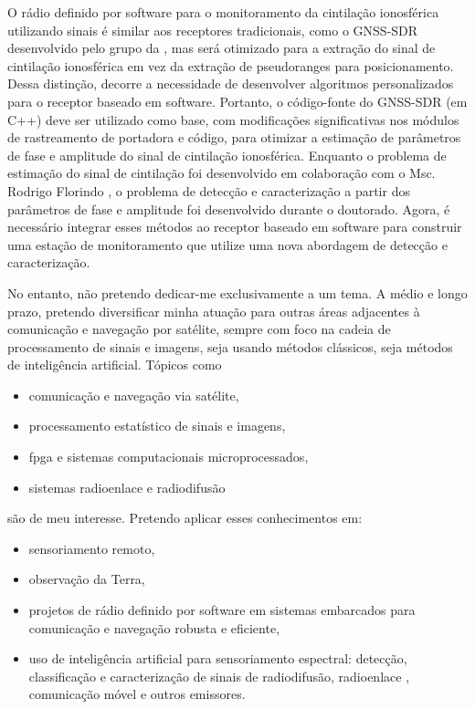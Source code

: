 \documentclass{article}
\begin{document}
O rádio definido por software para o monitoramento da cintilação ionosférica utilizando sinais  é similar aos receptores tradicionais, como o GNSS-SDR desenvolvido pelo grupo  da , mas será otimizado para a extração do sinal de cintilação ionosférica em vez da extração de pseudoranges para posicionamento. Dessa distinção, decorre a necessidade de desenvolver algoritmos personalizados para o receptor baseado em software. Portanto, o código-fonte do GNSS-SDR (em C++) deve ser utilizado como base, com modificações significativas nos módulos de rastreamento de portadora e código, para otimizar a estimação de parâmetros de fase e amplitude do sinal de cintilação ionosférica. Enquanto o problema de estimação do sinal de cintilação foi desenvolvido em colaboração com o Msc. Rodrigo Florindo \cite{florindoAdvancedKalmanFilter2025}, o problema de detecção e caracterização a partir dos parâmetros de fase e amplitude foi desenvolvido durante o doutorado. Agora, é necessário integrar esses métodos ao receptor baseado em software para construir uma estação de monitoramento que utilize uma nova abordagem de detecção e caracterização.

No entanto, não pretendo dedicar-me exclusivamente a um tema. A médio e longo prazo, pretendo diversificar minha atuação para outras áreas adjacentes à comunicação e navegação por satélite, sempre com foco na cadeia de processamento de sinais e imagens, seja usando métodos clássicos, seja métodos de inteligência artificial. Tópicos como
\begin{itemize}
    \item comunicação e navegação via satélite,
    \item processamento estatístico de sinais e imagens,
    \item \Gls{fpga} e sistemas computacionais microprocessados,
    \item sistemas radioenlace e radiodifusão
\end{itemize}

são de meu interesse. Pretendo aplicar esses conhecimentos em:
\begin{itemize}
    \item sensoriamento remoto,
    \item observação da Terra,
    \item projetos de rádio definido por software em sistemas embarcados para comunicação e navegação robusta e eficiente,
    \item uso de inteligência artificial para sensoriamento espectral: detecção, classificação e caracterização de sinais de radiodifusão, radioenlace , comunicação móvel e outros emissores.
\end{itemize}
\end{document}

